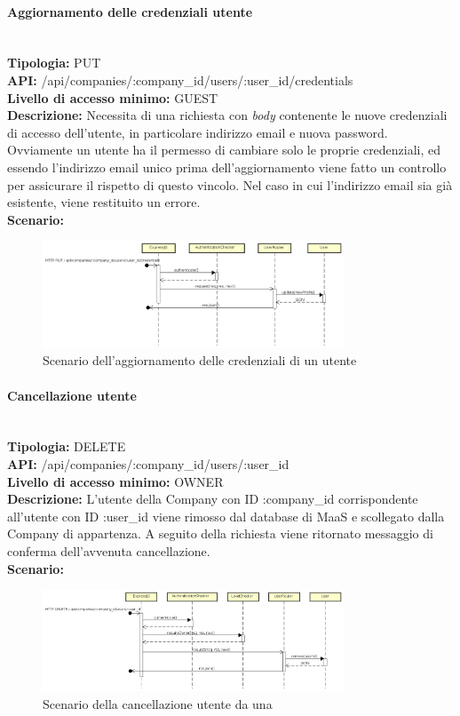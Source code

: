 \paragraph{Aggiornamento delle credenziali utente}\mbox{}\\
\textbf{Tipologia:} PUT \\
\textbf{API:} /api/companies/:company\_id/users/:user\_id/credentials \\
\textbf{Livello di accesso minimo:} GUEST \\
\textbf{Descrizione:} Necessita di una richiesta con \textit{body} contenente le nuove credenziali di accesso dell'utente, in particolare indirizzo email e nuova password. Ovviamente un utente ha il permesso di cambiare solo le proprie credenziali, ed essendo l'indirizzo email unico prima dell'aggiornamento viene fatto un controllo per assicurare il rispetto di questo vincolo. Nel caso in cui l'indirizzo email sia già esistente, viene restituito un errore. \\
\textbf{Scenario:} 
\begin{figure}[H]
\centering
\includegraphics[width=0.8\textwidth]{res/sections/backend/sequence/(PUT)credenzialiUtente.png}
\caption{Scenario dell'aggiornamento delle credenziali di un utente}
\end{figure}

\newpage
\paragraph{Cancellazione utente}\mbox{}\\
\textbf{Tipologia:} DELETE \\
\textbf{API:} /api/companies/:company\_id/users/:user\_id \\
\textbf{Livello di accesso minimo:} OWNER \\
\textbf{Descrizione:} L'utente della Company con ID :company\_id corrispondente all'utente con ID :user\_id viene rimosso dal database di MaaS e scollegato dalla Company di appartenza. A seguito della richiesta viene ritornato messaggio di conferma dell'avvenuta cancellazione. \\
\textbf{Scenario:} 
\begin{figure}[H]
\centering
\includegraphics[width=0.8\textwidth]{res/sections/backend/sequence/(DELETE)user.png}
\caption{Scenario della cancellazione utente da una }
\end{figure}

